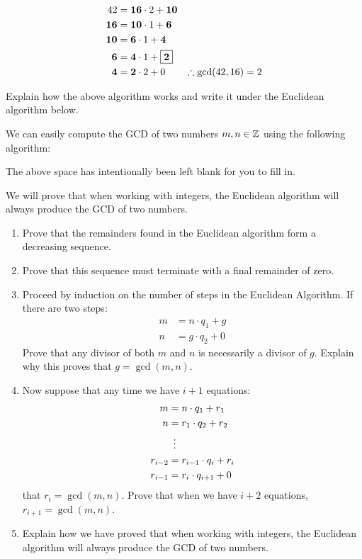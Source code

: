 \documentclass{ximera}
\begin{document}
\begin{align*}
42 &= \boldsymbol{16}\cdot 2 + \boldsymbol{10}\\
\boldsymbol{16} &= \boldsymbol{10} \cdot 1 + \boldsymbol{6}\\
\boldsymbol{10} &= \boldsymbol{6} \cdot 1 + \boldsymbol{4}\\
\boldsymbol{6} &= \boldsymbol{4} \cdot 1 + \fbox{$\boldsymbol{2}$}\\
\boldsymbol{4} &= \boldsymbol{2} \cdot 2 + 0 \qquad \therefore \gcd(42,16) = 2 
\end{align*}

Explain how the above algorithm works and write it under the Euclidean
algorithm below.


\begin{theorem} 
We can easily compute the GCD of two numbers $m,n\in\mathbb Z$ using the
following algorithm:
\vspace{2in}

\end{theorem}
\noindent The above space has intentionally been left blank for you to
fill in.

\begin{exercise} 
We will prove that when working with integers, the Euclidean algorithm
will always produce the GCD of two numbers.
\begin{enumerate}
\item Prove that the remainders found in the Euclidean algorithm form a
  decreasing sequence.
\item Prove that this sequence must terminate with a final remainder
  of zero.
\item Proceed by induction on the number of steps in the Euclidean
  Algorithm. If there are two steps:
\begin{align*}
m &= n\cdot q_1 + g \\
n &= g\cdot q_2 +0
\end{align*}
Prove that any divisor of both $m$ and $n$ is necessarily a divisor
of $g$. Explain why this proves that $g = \gcd(m,n)$.
\item Now suppose that any time we have $i+1$ equations:
\begin{align*}
m &= n\cdot q_1 + r_1 \\
n &= r_1\cdot q_2 + r_2 \\
  &\hspace{.5em}\vdots\\
r_{i-2} &= r_{i-1}\cdot q_{i} + r_i\\
r_{i-1} &= r_{i}\cdot q_{i+1} + 0
\end{align*}
that $r_i = \gcd(m,n)$. Prove that when we have $i+2$ equations, $r_{i+1}
= \gcd(m,n)$.
\item Explain how we have proved that when working with integers, the
  Euclidean algorithm will always produce the GCD of two numbers.
\end{enumerate}
\end{exercise}
\end{document}
